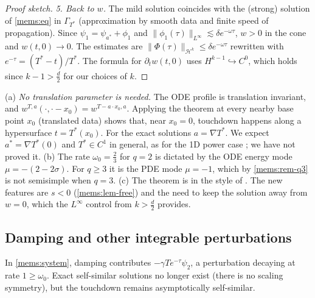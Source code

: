 \begin{proof}[Proof sketch]
\emph{5. Back to $w$.} The mild solution coincides with the (strong) solution of
\eqref{mems:eq} in $\Gamma_{T^*}$ (approximation by smooth data and finite
speed of propagation). Since $\psi_1=\psi_{a^*}+\phi_1$ and
$\|\phi_1(\tau)\|_{L^\infty}\lesssim\delta e^{-\omega\tau}$, $w>0$ in the cone and $w(t,0)\to0$.
The estimates are $\|\Phi(\tau)\|_{\mathcal H^k}\le\delta e^{-\omega\tau}$ rewritten
with $e^{-\tau}=(T^*-t)/T^*$. The formula for $\partial_tw(t,0)$ uses
$H^{k-1}\hookrightarrow C^0$, which holds since $k-1>\frac d2$ for our
choices of $k$.
\end{proof}

\begin{remark}\label{mems:rem-main}
(a) \emph{No translation parameter is needed.} The ODE profile is
translation invariant, and $w^{T,a}(\cdot,\cdot-x_0)=w^{T-a\cdot x_0,a}$. Applying
the theorem at every nearby base point $x_0$ (translated data) shows that,
near $x_0=0$, touchdown happens along a hypersurface $t=T^*(x_0)$. For the
exact solutions $a=\nabla T^*$. We expect $a^*=\nabla T^*(0)$ and $T^*\in C^1$
in general, as for the 1D power case \cite{MerleZaag2007}; we have not proved it.
(b) The rate $\omega_0=\frac23$ for $q=2$ is dictated by the ODE energy mode
$\mu=-(2-2\sigma)$. For $q\ge3$ it is the PDE mode $\mu=-1$, which by
\cref{mems:rem-q3} is not semisimple when $q=3$.
(c) The theorem is in the style of
\cite{DonningerSchoerkhuber2016,DonningerSchoerkhuber2017,Ostermann2024}.
The new features are $s<0$ (\cref{mems:lem-free}) and the need to keep the
solution away from $w=0$, which the $L^\infty$ control from $k>\frac d2$
provides.
\end{remark}

\subsection{Damping and other integrable perturbations}
\label{mems:sec-damp}
In \eqref{mems:system}, damping contributes $-\gamma Te^{-\tau}\psi_2$, a perturbation
decaying at rate $1\ge\omega_0$. Exact self-similar solutions no longer exist
(there is no scaling symmetry), but the touchdown remains asymptotically
self-similar.

